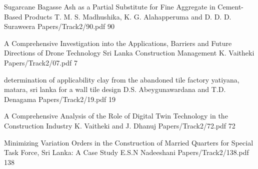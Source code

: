         
        \addpaper
    	{Sugarcane Bagasse Ash as a Partial Substitute for Fine Aggregate in Cement-Based Products}
   		 {T. M. S. Madhushika, K. G. Alahapperuma and D. D. D. Suraweera} 
   		 {Papers/Track2/90.pdf}
        {90} 

        

        

        
        \addpaper
    	{A Comprehensive Investigation into the Applications, Barriers and Future Directions of Drone Technology Sri Lanka Construction Management}
   		 {K. Vaitheki} 
   		 {Papers/Track2/07.pdf}
        {7} 

        

     
        \addpaper
    	{determination of applicability clay from the abandoned tile factory yatiyana, matara, sri lanka for a wall tile design}
   	   {D.S. Abeygunawardana and T.D. Denagama} 
   		 {Papers/Track2/19.pdf}
        {19} 

        
        \addpaper
    	{A Comprehensive Analysis of the Role of Digital Twin Technology in the Construction Industry}
   		 {K. Vaitheki and J. Dhanuj} 
   		 {Papers/Track2/72.pdf}
        {72} 

        

        

        
        \addpaper
    	{Minimizing Variation Orders in the Construction of Married Quarters for Special Task Force, Sri Lanka: A Case Study}
   		 {E.S.N Nadeeshani} 
   		 {Papers/Track2/138.pdf}
        {138} 

        

